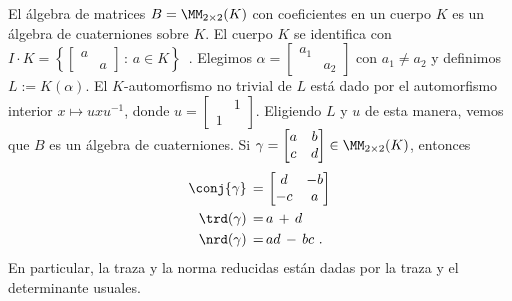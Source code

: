 \begin{ejemploMatrices}
El \'{a}lgebra de matrices $B=\MM_{2\times 2}(K)$ con coeficientes en un
cuerpo $K$ es un \'{a}lgebra de cuaterniones sobre $K$. El cuerpo $K$ se
identifica con
\begin{math}
 I\cdot K=\left\lbrace \begin{bmatrix} a & \\ & a \end{bmatrix}\,:\,
 a\in K\right\rbrace
\end{math}~.
Elegimos $\alpha=\begin{bmatrix} a_{1} & \\ & a_{2} \end{bmatrix}$ con
$a_{1}\not = a_{2}$ y definimos $L:=K(\alpha)$. El $K$-automorfismo no trivial
de $L$ est\'{a} dado por el automorfismo interior $x\mapsto uxu^{-1}$,
donde $u=\begin{bmatrix} & 1 \\ 1 & \end{bmatrix}$. Eligiendo $L$ y $u$
de esta manera, vemos que $B$ es un \'{a}lgebra de cuaterniones. Si
$\gamma=\begin{bmatrix} a & b \\ c & d \end{bmatrix}\in\MM_{2\times 2}(K)$,
entonces
\begin{align*}
 \conj{\gamma} \,=\, & \begin{bmatrix} d & -b \\ -c & a \end{bmatrix} \\
 \trd(\gamma) \,=\, & a\,+\,d \\
 \nrd(\gamma) \,=\, & ad\,-\,bc\text{ .}
\end{align*}
%
En particular, la traza y la norma reducidas est\'{a}n dadas por la traza
y el determinante usuales.

\end{ejemploMatrices}
